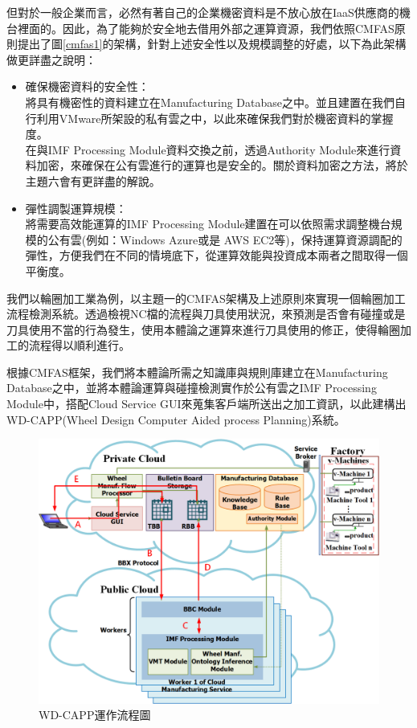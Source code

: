 \documentclass[CJK,12pt,t]{article}
\begin{document}
\begin{CJK*}{UTF8}{bkai}
		但對於一般企業而言，必然有著自己的企業機密資料是不放心放在IaaS供應商的機台裡面的。因此，為了能夠於安全地去借用外部之運算資源，我們依照CMFAS原則提出了圖\ref{cmfas1}的架構，針對上述安全性以及規模調整的好處，以下為此架構做更詳盡之說明：
		
		\begin{itemize}
		\setlength{\itemsep}{5pt}
			\item 確保機密資料的安全性：\\
					將具有機密性的資料建立在Manufacturing Database之中。並且建置在我們自行利用VMware所架設的私有雲之中，以此來確保我們對於機密資料的掌握度。\\
					在與IMF Processing Module資料交換之前，透過Authority Module來進行資料加密，來確保在公有雲進行的運算也是安全的。關於資料加密之方法，將於主題六會有更詳盡的解說。

			\item 彈性調製運算規模：\\
				將需要高效能運算的IMF Processing Module建置在可以依照需求調整機台規模的公有雲(例如：Windows Azure或是 AWS EC2等)，保持運算資源調配的彈性，方便我們在不同的情境底下，從運算效能與投資成本兩者之間取得一個平衡度。
		\end{itemize}

		我們以輪圈加工業為例，以主題一的CMFAS架構及上述原則來實現一個輪圈加工流程檢測系統。透過檢視NC檔的流程與刀具使用狀況，來預測是否會有碰撞或是刀具使用不當的行為發生，使用本體論之運算來進行刀具使用的修正，使得輪圈加工的流程得以順利進行。

		根據CMFAS框架，我們將本體論所需之知識庫與規則庫建立在Manufacturing Database之中，並將本體論運算與碰撞檢測實作於公有雲之IMF Processing Module中，搭配Cloud Service GUI來蒐集客戶端所送出之加工資訊，以此建構出WD-CAPP(Wheel Design Computer Aided process Planning)系統。

		\vspace{20pt}
		\begin{figure}[ht]
			\begin{center}
				\includegraphics[scale=0.3]{figs/step-wdcaspp.png}
				\caption{WD-CAPP運作流程圖}
				\label{cmfas2}
			\end{center}
		\end{figure}


\end{CJK*}
\end{document}
